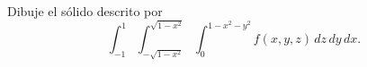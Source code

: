 Dibuje el sólido descrito por
\[
\int_{-1}^{1}\int_{-\sqrt{1-x^2}}^{\sqrt{1-x^2}}
\int_0^{1-x^2-y^2} f(x,y,z)\,dz\,dy\,dx.
\]
